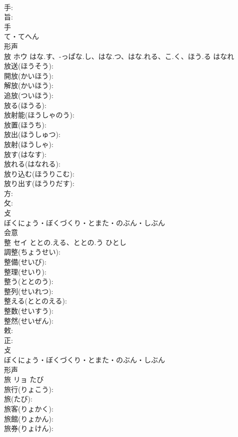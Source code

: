 \documentclass[8pt]{extreport}
\begin{document}
\begin{CJK}{UTF8}{min}
\\	手: 
\\	旨: 
\\	手	
\\	て・てへん	
\\	形声 
\\	放	ホウ	はな.す、-っぱな.し、はな.つ、はな.れる、こ.く、ほう.る	はなれ	
\\	放送(ほうそう): 
\\	開放(かいほう): 
\\	解放(かいほう): 
\\	追放(ついほう): 
\\	放る(ほうる): 
\\	放射能(ほうしゃのう): 
\\	放置(ほうち): 
\\	放出(ほうしゅつ): 
\\	放射(ほうしゃ): 
\\	放す(はなす): 
\\	放れる(はなれる): 
\\	放り込む(ほうりこむ): 
\\	放り出す(ほうりだす): 
\\	方: 
\\	攵: 
\\	攴	
\\	ぼくにょう・ぼくづくり・とまた・のぶん・しぶん	
\\	会意 
\\	整	セイ	ととの.える、ととの.う	ひとし	
\\	調整(ちょうせい): 
\\	整備(せいび): 
\\	整理(せいり): 
\\	整う(ととのう): 
\\	整列(せいれつ): 
\\	整える(ととのえる): 
\\	整数(せいすう): 
\\	整然(せいぜん): 
\\	敕: 
\\	正: 
\\	攴	
\\	ぼくにょう・ぼくづくり・とまた・のぶん・しぶん	
\\	形声 
\\	旅	リョ	たび		
\\	旅行(りょこう): 
\\	旅(たび): 
\\	旅客(りょかく): 
\\	旅館(りょかん): 
\\	旅券(りょけん): 

\end{CJK}
\end{document}
